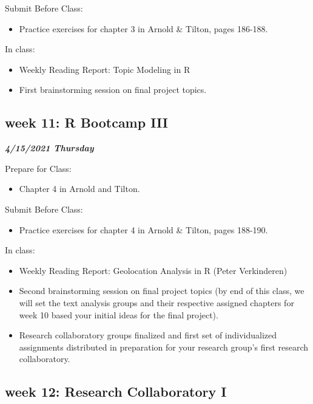\documentclass[
]{book}
\providecommand{\tightlist}{%
  \setlength{\itemsep}{0pt}\setlength{\parskip}{0pt}}
\begin{document}
Submit Before Class:

\begin{itemize}
\tightlist
\item
  Practice exercises for chapter 3 in Arnold \& Tilton, pages 186-188.
\end{itemize}

In class:

\begin{itemize}
\tightlist
\item
  Weekly Reading Report: Topic Modeling in R
\item
  First brainstorming session on final project topics.
\end{itemize}

\hypertarget{week-11-r-bootcamp-iii}{%
\subsection{week 11: R Bootcamp III}\label{week-11-r-bootcamp-iii}}

\textbf{\emph{4/15/2021 Thursday}}

Prepare for Class:

\begin{itemize}
\tightlist
\item
  Chapter 4 in Arnold and Tilton.
\end{itemize}

Submit Before Class:

\begin{itemize}
\tightlist
\item
  Practice exercises for chapter 4 in Arnold \& Tilton, pages 188-190.
\end{itemize}

In class:

\begin{itemize}
\tightlist
\item
  Weekly Reading Report: Geolocation Analysis in R (Peter Verkinderen)
\item
  Second brainstorming session on final project topics (by end of this class, we will set the text analysis groups and their respective assigned chapters for week 10 based your initial ideas for the final project).
\item
  Research collaboratory groups finalized and first set of individualized assignments distributed in preparation for your research group's first research collaboratory.
\end{itemize}

\hypertarget{week-12-research-collaboratory-i}{%
\subsection{week 12: Research Collaboratory I}\label{week-12-research-collaboratory-i}}
\end{document}
